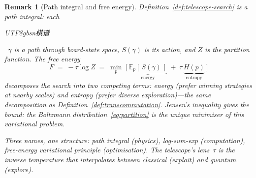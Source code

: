 \documentclass[11pt,a4paper]{article}
\newtheorem{remark}[theorem]{Remark}
\begin{document}
\begin{remark}[Path integral and free energy]%
\label{rem:path-integral}
\color{black!60}%
Definition~\ref{def:telescope-search} is a path integral:
each \begin{CJK}{UTF8}{gbsn}棋谱\end{CJK}~$\gamma$
is a path through board-state space,
$S(\gamma)$ is its action, and
$Z$ is the partition function.
The \emph{free energy}
\[
  F \;=\; -\tau \log Z
  \;=\; \min_{p}\;\bigl[\,
    \underbrace{\mathbb{E}_p[\,S(\gamma)\,]}_{\text{energy}}
    \;+\;
    \tau\,
    \underbrace{H(p)}_{\text{entropy}}
  \,\bigr]
\]
decomposes the search into two competing terms:
energy (prefer winning strategies at nearby scales)
and entropy (prefer diverse exploration)---the
same decomposition as
Definition~\ref{def:transcommutation}.
Jensen's inequality gives the bound:
the Boltzmann distribution~\eqref{eq:partition}
is the unique minimiser of this variational problem.

\medskip\noindent
Three names, one structure:
\emph{path integral} (physics),
\emph{log-sum-exp} (computation),
\emph{free-energy variational principle} (optimisation).
The telescope's lens~$\tau$ is the inverse temperature
that interpolates between classical (exploit) and
quantum (explore).
\end{remark}
\end{document}
